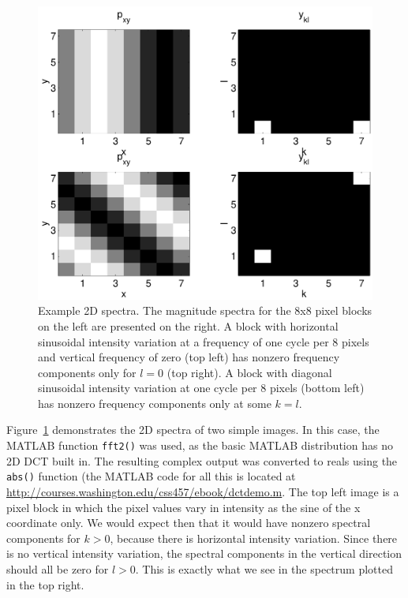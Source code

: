 \begin{enumerate}
\begin{figure}
\centerline{\includegraphics[width=\textwidth]{ch-av/dctdemo}}
\caption[Example 2D spectra]{Example 2D spectra. The magnitude
spectra for the 8x8 pixel blocks on the left are presented on the
right. A block with horizontal sinusoidal intensity variation at a
frequency of one cycle per 8 pixels and vertical frequency of zero
(top left) has nonzero frequency components only for $l=0$ (top
right). A block with diagonal sinusoidal intensity variation at one
cycle per 8 pixels (bottom left) has nonzero frequency components only
at some $k=l$.\label{fg:dctdemo}}
\end{figure}

Figure~\ref{fg:dctdemo} demonstrates the 2D spectra of two simple
images. In this case, the MATLAB function \verb|fft2()| was used, as
the basic MATLAB distribution has no 2D DCT built in. The resulting
complex output was converted to reals using the \verb|abs()| function
(the MATLAB code for all this is located at
\url{http://courses.washington.edu/css457/ebook/dctdemo.m}. The top
left image is a pixel block in which the pixel values vary in
intensity as the sine of the x coordinate only.  We would expect then
that it would have nonzero spectral components for $k>0$, because
there is horizontal intensity variation.  Since there is no vertical
intensity variation, the spectral components in the vertical direction
should all be zero for $l>0$. This is exactly what we see in the
spectrum plotted in the top right.


\end{enumerate}
